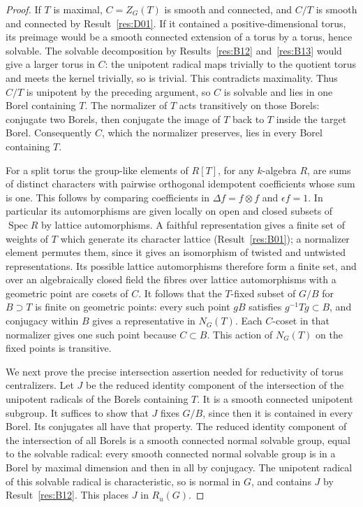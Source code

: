 \documentclass[11pt,a4paper,openany,oneside]{book}
\theoremstyle{resultstyle}
\theoremstyle{definition}
\numberwithin{equation}{chapter}
\begin{document}
\begin{proof}
If \(T\) is maximal, \(C=Z_G(T)\) is smooth and connected, and
\(C/T\) is smooth and connected by Result~\ref{res:D01}.
If it contained a positive-dimensional torus, its preimage would
be a smooth connected extension of a torus by a torus, hence
solvable. The solvable decomposition by Results~\ref{res:B12}
and~\ref{res:B13} would give a larger torus in \(C\): the
unipotent radical maps trivially to the quotient torus and meets
the kernel trivially, so is trivial. This contradicts maximality.
Thus \(C/T\) is unipotent by the preceding argument, so \(C\)
is solvable and lies in one Borel containing \(T\). The normalizer
of \(T\) acts transitively on those Borels: conjugate two Borels,
then conjugate the image of \(T\) back to \(T\) inside the target
Borel. Consequently \(C\), which the normalizer preserves, lies
in every Borel containing \(T\).

For a split torus the group-like elements of \(R[T]\), for any
\(k\)-algebra \(R\), are sums of distinct characters with
pairwise orthogonal idempotent coefficients whose sum is one.
This follows by comparing coefficients in
\(\Delta f=f\otimes f\) and \(\epsilon f=1\).
In particular its automorphisms are given locally on open and
closed subsets of \(\operatorname{Spec} R\) by lattice
automorphisms. A faithful representation gives a finite set of
weights of \(T\) which generate its character lattice
(Result~\ref{res:B01}); a normalizer element permutes them,
since it gives an isomorphism of twisted and untwisted
representations. Its possible lattice automorphisms therefore
form a finite set, and over an algebraically closed field the
fibres over lattice automorphisms with a geometric point
are cosets of \(C\). It follows that the \(T\)-fixed subset
of \(G/B\) for \(B\supset T\) is finite on geometric points:
every such point \(gB\) satisfies \(g^{-1}Tg\subset B\),
and conjugacy within \(B\) gives a representative in \(N_G(T)\).
Each \(C\)-coset in that normalizer gives one such point
because \(C\subset B\). This action of \(N_G(T)\) on the fixed
points is transitive.

We next prove the precise intersection assertion needed for
reductivity of torus centralizers. Let \(J\) be the reduced
identity component of the intersection of the unipotent radicals
of the Borels containing \(T\). It is a smooth connected
unipotent subgroup. It suffices to show that \(J\) fixes \(G/B\),
since then it is contained in every Borel. Its conjugates all
have that property. The reduced identity component of the
intersection of all Borels is a smooth connected normal
solvable group, equal to the solvable radical: every smooth
connected normal solvable group is in a Borel by maximal
dimension and then in all by conjugacy. The unipotent radical
of this solvable radical is characteristic, so is normal
in \(G\), and contains \(J\) by Result~\ref{res:B12}. This
places \(J\) in \(R_u(G)\).


\end{proof}
\end{document}
